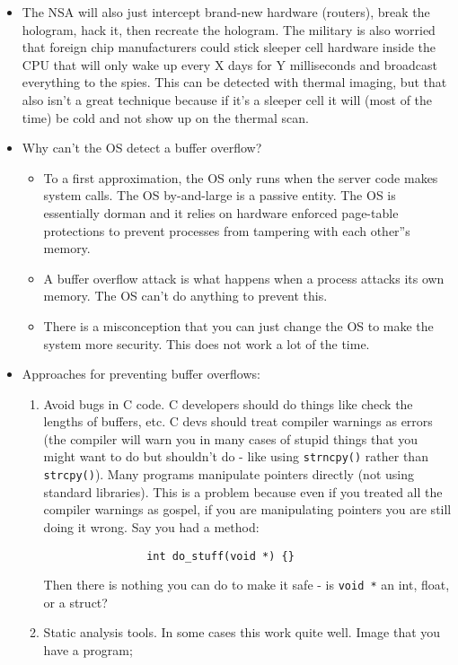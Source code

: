 \documentclass[12pt]{article}
\theoremstyle{definition}
\begin{document}
\begin{itemize}
    \item The NSA will also just intercept brand-new hardware (routers), break the hologram, hack it, then recreate the hologram. The military is also worried that foreign chip manufacturers could stick sleeper cell hardware inside the CPU that will only wake up every X days for Y milliseconds and broadcast everything to the spies. This can be detected with thermal imaging, but that also isn't a great technique because if it's a sleeper cell it will (most of the time) be cold and not show up on the thermal scan.
    \item Why can't the OS detect a buffer overflow?
        \begin{itemize}
            \item To a first approximation, the OS only runs when the server code makes system calls. The OS by-and-large is a passive entity. The OS is essentially dorman and it relies on hardware enforced page-table protections to prevent processes from tampering with each other''s memory.
            \item A buffer overflow attack is what happens when a process attacks its own memory. The OS can't do anything to prevent this.
            \item There is a misconception that you can just change the OS to make the system more security. This does not work a lot of the time.
        \end{itemize}
    \item Approaches for preventing buffer overflows:
        \begin{enumerate}
            \item Avoid bugs in C code. C developers should do things like check the lengths of buffers, etc. C devs should treat compiler warnings as errors (the compiler will warn you in many cases of stupid things that you might want to do but shouldn't do - like using \texttt{strncpy()} rather than \texttt{strcpy()}).
            Many programs manipulate pointers directly (not using standard libraries). This is a problem because even if you treated all the compiler warnings as gospel, if you are manipulating pointers you are still doing it wrong. Say you had a method:
            \begin{lstlisting}
                int do_stuff(void *) {}
            \end{lstlisting}
            Then there is nothing you can do to make it safe - is \texttt{void *} an int, float, or a struct?
            \item Static analysis tools. In some cases this work quite well. Image that you have a program;

\end{enumerate}
\end{itemize}
\end{document}
